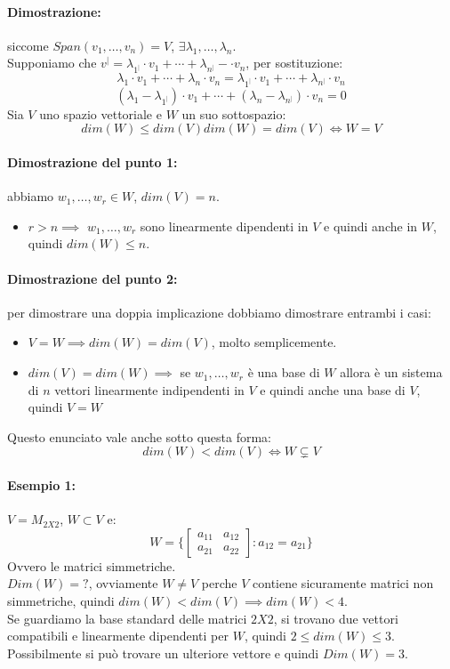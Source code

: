 \documentclass[12pt,a4paper]{article}
\begin{document}
\paragraph{Dimostrazione:} siccome $Span(v_1,\ldots,v_n) = V$, $\exists \lambda_1,\ldots,\lambda_n$.\\
Supponiamo che $v^| = \lambda_{1^|} \cdot v_1 + \cdots + \lambda_{n^|} - \cdot v_n$, per sostituzione:
\[
\lambda_1 \cdot v_1 + \cdots + \lambda_n \cdot v_n = \lambda_{1^|} \cdot v_1 + \cdots + \lambda_{n^|} \cdot v_n
\]
\[
(\lambda_ 1 - \lambda_{1^|}) \cdot v_1 + \cdots + (\lambda_n - \lambda_{n^|}) \cdot v_n = 0
\]
Sia $V$ uno spazio vettoriale e $W$ un suo sottospazio:
\[
dim(W) \leq dim(V)
dim(W) = dim(V) \Leftrightarrow W = V
\]
\paragraph{Dimostrazione del punto 1:} abbiamo $w_1,\ldots,w_r \in W$, $dim(V) = n$.
\begin{itemize}
  \item $r > n \implies$ $w_1,\ldots,w_r$ sono linearmente dipendenti in $V$ e quindi anche in $W$, quindi $dim(W) \leq n$. 
\end{itemize}
\paragraph{Dimostrazione del punto 2:} per dimostrare una doppia implicazione dobbiamo dimostrare entrambi i casi:
\begin{itemize}
  \item $V = W \implies dim(W) = dim(V)$, molto semplicemente.
  \item $dim(V) = dim(W) \implies $ se $w_1,\ldots,w_r$ è una base di $W$ allora è un sistema di $n$ vettori linearmente indipendenti in $V$ e quindi anche una base di $V$, quindi $V = W$
\end{itemize}
Questo enunciato vale anche sotto questa forma:
\[
dim(W) < dim(V) \Leftrightarrow W \subsetneq V
\]
\paragraph{Esempio 1:} $V = M_{2X2}$, $W \subset V$ e:
\[
W = \{\begin{bmatrix}
  a_{11} & a_{12}\\
  a_{21} & a_{22}
\end{bmatrix} : a_{12} = a_{21}\}
\]
Ovvero le matrici simmetriche.\\
$Dim(W) = ?$, ovviamente $W \ne V$ perche $V$ contiene sicuramente matrici non simmetriche, quindi $dim(W) < dim(V) \implies dim(W) < 4$.\\
Se guardiamo la base standard delle matrici $2X2$, si trovano due vettori compatibili e linearmente dipendenti per $W$, quindi $2 \leq dim(W) \leq 3$.\\
Possibilmente si può trovare un ulteriore vettore e quindi $Dim(W) = 3$.
\end{document}
